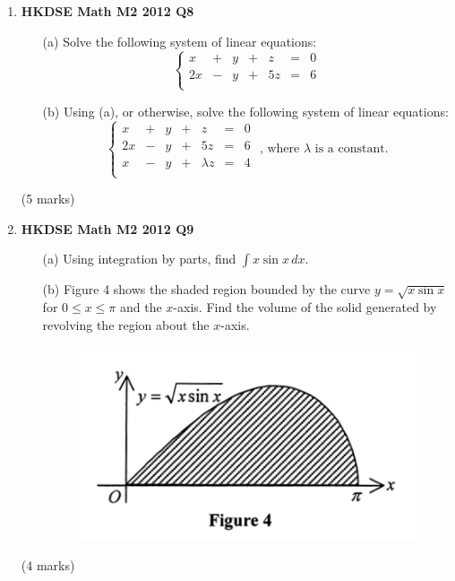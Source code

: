 \documentclass{report}
\begin{document}
\begin{enumerate}
	\item \textbf{HKDSE Math M2 2012 Q8}
	\begin{enumerate}
		\item [(a)]Solve the following system of linear equations:
		$$\left\{\begin{matrix}
			x & + & y & + & z & = & 0\\
			2x & - & y & + & 5z & = & 6\\
		\end{matrix}\right.$$
		\item [(b)]Using (a), or otherwise, solve the following system of linear equations: 
		$$\left\{\begin{matrix}
			x & + & y & + & z & = & 0\\
			2x & - & y & + & 5z & = & 6\\
			x & - & y & + & \lambda z & = & 4\\
		\end{matrix}\right.\text{ , where }\lambda\text{ is a constant.}$$ 
	\end{enumerate}
	(5 marks)

	\newpage

	\item \textbf{HKDSE Math M2 2012 Q9}
	\begin{enumerate}
		\item [(a)]Using integration by parts, find $\int x\sin{x}\,dx$. 
		\item [(b)]Figure 4 shows the shaded region bounded by the curve $y = \sqrt{x\sin{x}}$ for $0 \leq x \leq \pi$ and the $x$-axis. Find the volume of the solid generated by revolving the region about the $x$-axis.
	\begin{figure}[H]
		\centering
		\includegraphics[width = .5\linewidth]{2012Figure4}
	\end{figure}
	\end{enumerate}
	(4 marks)


\end{enumerate}
\end{document}
